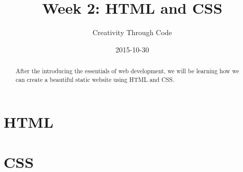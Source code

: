 \documentclass[11pt, letterpaper]{article}
\title{Week 2: HTML and CSS}
\date{2015-10-30}
\author{Creativity Through Code}
\begin{document}
	\maketitle
	\newpage
	\begin{abstract}
		After the introducing the essentials of web development, we will be learning how we can create a beautiful static website using HTML and CSS.
	\end{abstract}
	\section{HTML}
	\section{CSS}
	
\end{document}
